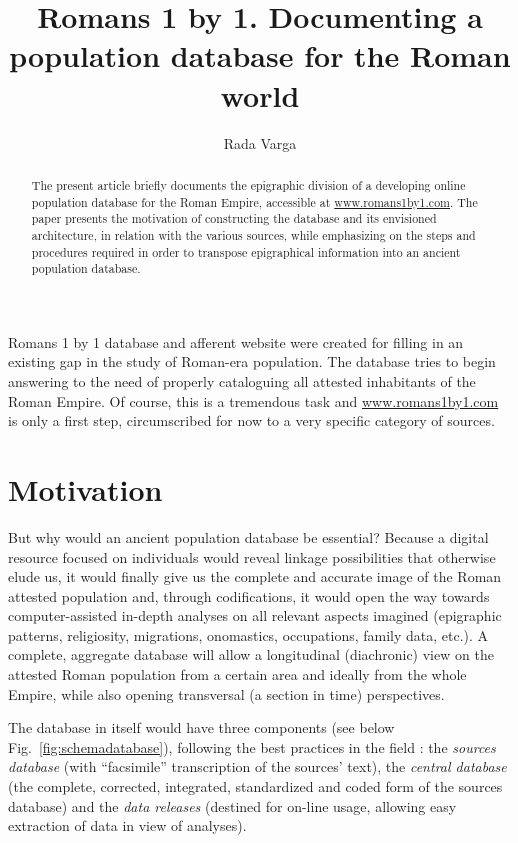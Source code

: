 \documentclass[amsthm,ebook]{saparticle}
\title{Romans 1 by 1. Documenting a population database for the Roman world}
\author[CLUJ]{Rada Varga\corref{first}}
\begin{document}
\maketitle

\begin{abstract}
 The present article briefly documents the epigraphic division of a developing online population database for the Roman
Empire, accessible at \url{www.romans1by1.com}. The paper presents the motivation of constructing the database and its
envisioned architecture, in relation with the various sources, while emphasizing on the steps and procedures required
in order to transpose epigraphical information into an ancient population database. 
\end{abstract}



\noindent Romans 1 by 1 database and afferent website were created for filling in an existing gap in the study of Roman-era
population. The database tries to begin answering to the need of properly cataloguing all attested inhabitants of the
Roman Empire. Of course, this is a tremendous task and \url{www.romans1by1.com} is only a first step, circumscribed for now
to a very specific category of sources.

\vspace{10pt}
\section{Motivation}


\noindent But why would an ancient population database be essential? Because a digital resource focused on individuals would
reveal linkage possibilities that otherwise elude us, it would finally give us the complete and accurate image of the
Roman attested population and, through codifications, it would open the way towards computer-assisted in-depth analyses
on all relevant aspects imagined (epigraphic patterns, religiosity, migrations, onomastics, occupations, family data,
etc.). A complete, aggregate database will allow a longitudinal (diachronic) view on the attested Roman population from
a certain area and ideally from the whole Empire, while also opening transversal (a section in time) perspectives.

The database in itself would have three components (see below Fig.~\ref{fig:schemadatabase}), following the best practices in the field
\citep{doi:10.3200/HMTS.37.1.34-38}: the \emph{sources database} (with ``facsimile'' transcription of the sources’ text), the \emph{central database} (the complete, corrected, integrated, standardized and coded form of the sources database) and the \emph{data releases} (destined for on-line usage, allowing easy extraction of data in view of analyses). 
\end{document}
